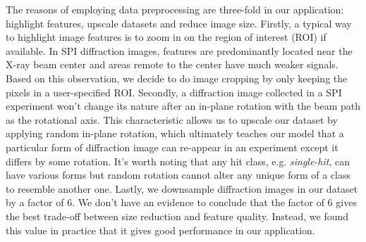The reasons of employing data preprocessing are three-fold in our application:
highlight features, upscale datasets and reduce image size.  Firstly, a typical
way to highlight image features is to zoom in on the region of interest (ROI) if
available.  In SPI diffraction images, features are predominantly located near
the X-ray beam center and areas remote to the center have much weaker signals.
Based on this observation, we decide to do image cropping by only keeping the
pixels in a user-specified ROI.  Secondly, a diffraction image collected in a
SPI experiment won't change its nature after an in-plane rotation with the beam
path as the rotational axis.  This characteristic allows us to upscale our
dataset by applying random in-plane rotation, which ultimately teaches our model
that a particular form of diffraction image can re-appear in an experiment
except it differs by some rotation.  It's worth noting that any hit class, e.g.
\textit{single-hit}, can have various forms but random rotation cannot alter any
unique form of a class to resemble another one.  Lastly, we downsample
diffraction images in our dataset by a factor of 6.  We don't have an evidence
to conclude that the factor of 6 gives the best trade-off between size reduction
and feature quality.  Instead, we found this value in practice that it gives
good performance in our application.  
